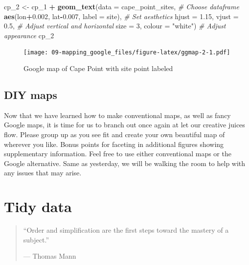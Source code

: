\documentclass[]{book}
\newenvironment{Shaded}{\begin{snugshade}}{\end{snugshade}}
\newcommand{\KeywordTok}[1]{\textcolor[rgb]{0.13,0.29,0.53}{\textbf{#1}}}
\newcommand{\DataTypeTok}[1]{\textcolor[rgb]{0.13,0.29,0.53}{#1}}
\newcommand{\DecValTok}[1]{\textcolor[rgb]{0.00,0.00,0.81}{#1}}
\newcommand{\FloatTok}[1]{\textcolor[rgb]{0.00,0.00,0.81}{#1}}
\newcommand{\StringTok}[1]{\textcolor[rgb]{0.31,0.60,0.02}{#1}}
\newcommand{\CommentTok}[1]{\textcolor[rgb]{0.56,0.35,0.01}{\textit{#1}}}
\newcommand{\OperatorTok}[1]{\textcolor[rgb]{0.81,0.36,0.00}{\textbf{#1}}}
\newcommand{\NormalTok}[1]{#1}
\theoremstyle{definition}
\theoremstyle{definition}
\theoremstyle{definition}
\theoremstyle{remark}
\begin{document}
\begin{Shaded}
\begin{Highlighting}[]
\NormalTok{cp_}\DecValTok{2}\NormalTok{ <-}\StringTok{ }\NormalTok{cp_}\DecValTok{1} \OperatorTok{+}
\StringTok{  }\KeywordTok{geom_text}\NormalTok{(}\DataTypeTok{data =}\NormalTok{ cape_point_sites, }\CommentTok{# Choose dataframe}
            \KeywordTok{aes}\NormalTok{(lon}\OperatorTok{+}\FloatTok{0.002}\NormalTok{, lat}\OperatorTok{-}\FloatTok{0.007}\NormalTok{, }\DataTypeTok{label =}\NormalTok{ site), }\CommentTok{# Set aesthetics}
            \DataTypeTok{hjust =} \FloatTok{1.15}\NormalTok{, }\DataTypeTok{vjust =} \FloatTok{0.5}\NormalTok{, }\CommentTok{# Adjust vertical and horizontal}
            \DataTypeTok{size =} \DecValTok{3}\NormalTok{, }\DataTypeTok{colour =} \StringTok{"white"}\NormalTok{) }\CommentTok{# Adjust appearance}
\NormalTok{cp_}\DecValTok{2}
\end{Highlighting}
\end{Shaded}

\begin{figure}
\centering
\texttt{[image: 09-mapping\_google\_files/figure-latex/ggmap-2-1.pdf]}
\caption{\label{fig:ggmap-2}Google map of Cape Point with site point
labeled}
\end{figure}

\section{DIY maps}\label{diy-maps}

Now that we have learned how to make conventional maps, as well as fancy
Google maps, it is time for us to branch out once again at let our
creative juices flow. Please group up as you see fit and create your own
beautiful map of wherever you like. Bonus points for faceting in
additional figures showing supplementary information. Feel free to use
either conventional maps or the Google alternative. Same as yesterday,
we will be walking the room to help with any issues that may arise.

\chapter{Tidy data}\label{tidy}

\begin{quote}
``Order and simplification are the first steps toward the mastery of a
subject.''

--- Thomas Mann
\end{quote}
\end{document}
